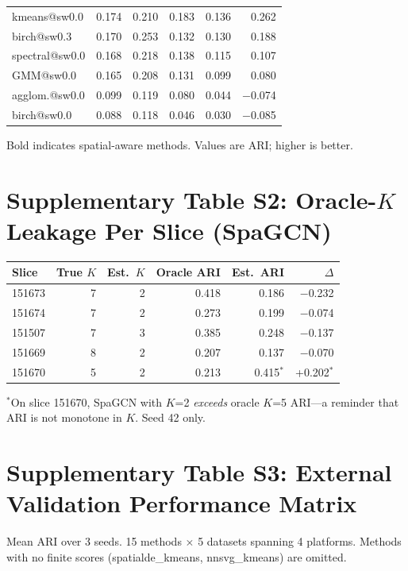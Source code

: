 \documentclass[11pt]{article}
\begin{document}
\begin{small}
\begin{longtable}{@{}lrrrrr@{}}
kmeans@sw0.0 & 0.174 & 0.210 & 0.183 & 0.136 & 0.262 \\
birch@sw0.3 & 0.170 & 0.253 & 0.132 & 0.130 & 0.188 \\
spectral@sw0.0 & 0.168 & 0.218 & 0.138 & 0.115 & 0.107 \\
GMM@sw0.0 & 0.165 & 0.208 & 0.131 & 0.099 & 0.080 \\
agglom.@sw0.0 & 0.099 & 0.119 & 0.080 & 0.044 & $-$0.074 \\
birch@sw0.0 & 0.088 & 0.118 & 0.046 & 0.030 & $-$0.085 \\
\bottomrule
\end{longtable}
\end{small}

Bold indicates spatial-aware methods. Values are ARI; higher is better.

\section*{Supplementary Table S2: Oracle-$K$ Leakage Per Slice (SpaGCN)}

\begin{tabular}{@{}lrrrrr@{}}
\toprule
Slice & True $K$ & Est.\ $K$ & Oracle ARI & Est.\ ARI & $\Delta$ \\
\midrule
151673 & 7 & 2 & 0.418 & 0.186 & $-$0.232 \\
151674 & 7 & 2 & 0.273 & 0.199 & $-$0.074 \\
151507 & 7 & 3 & 0.385 & 0.248 & $-$0.137 \\
151669 & 8 & 2 & 0.207 & 0.137 & $-$0.070 \\
151670 & 5 & 2 & 0.213 & 0.415$^*$ & +0.202$^*$ \\
\bottomrule
\end{tabular}

\medskip
\noindent$^*$On slice 151670, SpaGCN with $K$=2 \emph{exceeds}
oracle $K$=5 ARI---a reminder that ARI is not monotone in $K$.
Seed 42 only.

\section*{Supplementary Table S3: External Validation Performance Matrix}

Mean ARI over 3 seeds. 15 methods $\times$ 5 datasets spanning 4
platforms. Methods with no finite scores (spatialde\_kmeans,
nnsvg\_kmeans) are omitted.
\end{document}
